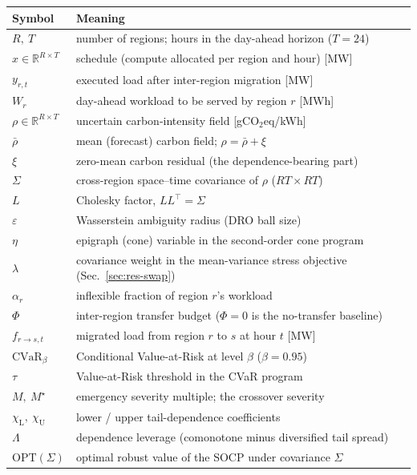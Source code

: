 \documentclass[12pt]{article}
\newcommand{\CVaR}{\mathrm{CVaR}}
\newcommand{\R}{\mathbb{R}}
\newcommand{\chiU}{\chi_{\mathrm{U}}}
\newcommand{\chiL}{\chi_{\mathrm{L}}}
\begin{document}
\smallskip
\begin{tabular}{@{}ll@{}}
\toprule
Symbol & Meaning \\
\midrule
$R,\ T$ & number of regions; hours in the day-ahead horizon ($T=24$) \\
$x\in\R^{R\times T}$ & schedule (compute allocated per region and hour) [MW] \\
$y_{r,t}$ & executed load after inter-region migration [MW] \\
$W_r$ & day-ahead workload to be served by region $r$ [MWh] \\
$\rho\in\R^{R\times T}$ & uncertain carbon-intensity field [gCO$_2$eq/kWh] \\
$\bar{\rho}$ & mean (forecast) carbon field; $\rho=\bar{\rho}+\xi$ \\
$\xi$ & zero-mean carbon residual (the dependence-bearing part) \\
$\Sigma$ & cross-region space--time covariance of $\rho$ ($RT\times RT$) \\
$L$ & Cholesky factor, $LL^\top=\Sigma$ \\
$\varepsilon$ & Wasserstein ambiguity radius (DRO ball size) \\
$\eta$ & epigraph (cone) variable in the second-order cone program \\
$\lambda$ & covariance weight in the mean-variance stress objective (Sec.~\ref{sec:res-swap}) \\
$\alpha_r$ & inflexible fraction of region $r$'s workload \\
$\Phi$ & inter-region transfer budget ($\Phi=0$ is the no-transfer baseline) \\
$f_{r\to s,t}$ & migrated load from region $r$ to $s$ at hour $t$ [MW] \\
$\CVaR_{\beta}$ & Conditional Value-at-Risk at level $\beta$ ($\beta=0.95$) \\
$\tau$ & Value-at-Risk threshold in the CVaR program \\
$M,\ M^\star$ & emergency severity multiple; the crossover severity \\
$\chiL,\ \chiU$ & lower / upper tail-dependence coefficients \\
$\Lambda$ & dependence leverage (comonotone minus diversified tail spread) \\
$\mathrm{OPT}(\Sigma)$ & optimal robust value of the SOCP under covariance $\Sigma$ \\
\bottomrule
\end{tabular}
\newpage
\end{document}
